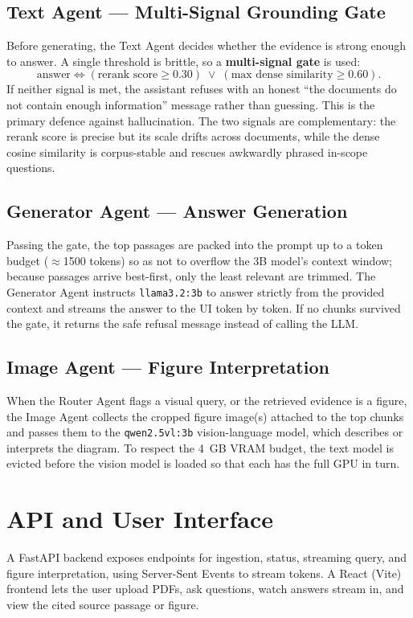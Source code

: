 \documentclass[12pt,a4paper]{report}
\begin{document}
\subsection{Text Agent --- Multi-Signal Grounding Gate}
Before generating, the Text Agent decides whether the evidence is strong enough to
answer. A single threshold is brittle, so a \textbf{multi-signal gate} is used:
\begin{equation}
\text{answer} \iff (\text{rerank score} \ge 0.30) \;\lor\; (\text{max dense similarity} \ge 0.60).
\end{equation}
If neither signal is met, the assistant refuses with an honest ``the documents do
not contain enough information'' message rather than guessing. This is the primary
defence against hallucination. The two signals are complementary: the rerank score
is precise but its scale drifts across documents, while the dense cosine similarity
is corpus-stable and rescues awkwardly phrased in-scope questions.

\subsection{Generator Agent --- Answer Generation}
Passing the gate, the top passages are packed into the prompt up to a token budget
($\approx$1500 tokens) so as not to overflow the 3B model's context window;
because passages arrive best-first, only the least relevant are trimmed. The
Generator Agent instructs \texttt{llama3.2:3b} to answer strictly from the provided
context and streams the answer to the UI token by token. If no chunks survived the
gate, it returns the safe refusal message instead of calling the LLM.

\subsection{Image Agent --- Figure Interpretation}
When the Router Agent flags a visual query, or the retrieved evidence is a figure,
the Image Agent collects the cropped figure image(s) attached to the top chunks and
passes them to the \texttt{qwen2.5vl:3b} vision-language model, which describes or
interprets the diagram. To respect the 4~GB VRAM budget, the text model is evicted
before the vision model is loaded so that each has the full GPU in turn.

\section{API and User Interface}
A FastAPI backend exposes endpoints for ingestion, status, streaming query, and
figure interpretation, using Server-Sent Events to stream tokens. A React (Vite)
frontend lets the user upload PDFs, ask questions, watch answers stream in, and
view the cited source passage or figure.
\end{document}
